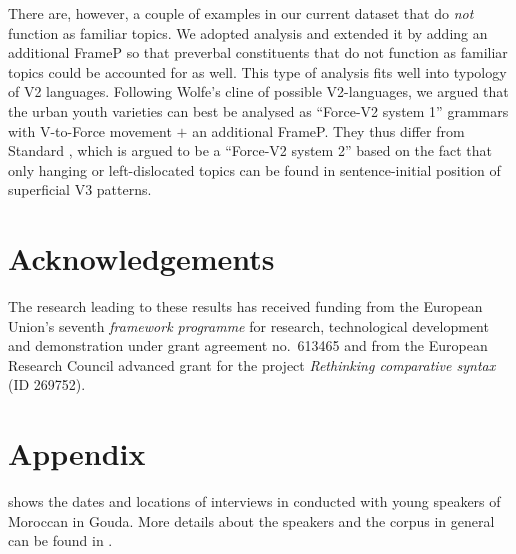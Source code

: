 \documentclass[output=paper]{langsci/langscibook}
\begin{document}
There are, however, a couple of examples in our current dataset that do
\emph{not} function as familiar topics. We adopted 
analysis and extended it by adding an additional FrameP so that preverbal
constituents that do not function as familiar topics could be accounted for as
well. This type of analysis fits well into  typology of V2
languages.  Following Wolfe's cline of possible V2-languages, we argued that
the  urban youth varieties can best be analysed as \enquote{Force-V2
system 1} grammars with V-to-Force movement $+$ an additional
FrameP. They thus differ from Standard , which is argued to be a
\enquote{Force-V2 system 2} based on the fact that only hanging or
left-dislocated topics can be found in
sentence-initial position of superficial V3 patterns.

\printchapterglossary{}

\section*{Acknowledgements}

The research leading to these results has received funding from the European
Union's seventh \emph{framework programme} for research, technological development and
demonstration under grant agreement no.\ 613465 and from the European Research
Council advanced grant for the project \emph{Rethinking comparative syntax} (ID
269752).

\section*{Appendix}\label{sec:app}

 shows the dates and locations of interviews in
conducted with young speakers of Moroccan  in Gouda. More details
about the speakers and the corpus in general can be found in
\citet{Mourigh:fc}.
\end{document}
